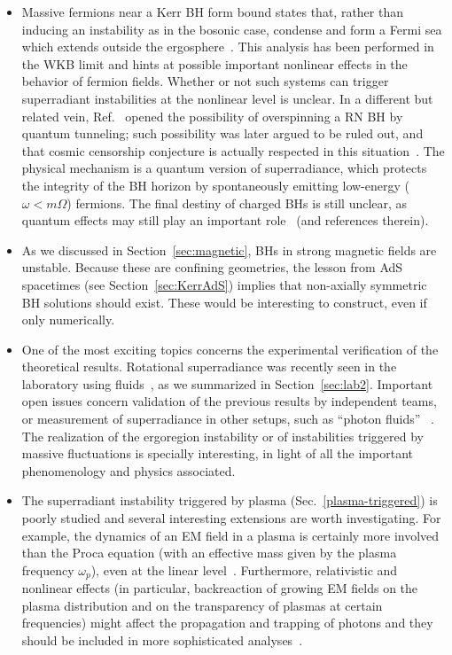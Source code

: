 \documentclass[11pt]{article}
\numberwithin{equation}{section} %
\begin{document}
\begin{itemize}
\item Massive fermions near a Kerr BH form bound states that, rather than inducing an instability as in the bosonic case, condense and form a Fermi sea which extends outside the ergosphere~\cite{Hartman:2009qu}. This analysis has been performed in the WKB limit and hints at possible important nonlinear effects in the behavior of fermion fields. Whether or not such systems can trigger superradiant instabilities at the nonlinear level is unclear. In a different but related vein, Ref.~\cite{Matsas:2007bj} opened the possibility of overspinning a RN BH by quantum tunneling;
such possibility was later argued to be ruled out, and that cosmic censorship conjecture is actually respected in this situation~\cite{Hod:2008kq}. The physical mechanism is a quantum version of superradiance, which protects the integrity of the BH horizon by spontaneously emitting low-energy ($\omega<m\Omega$) fermions. The final destiny of charged BHs is still unclear, as quantum effects may still play an important role~\cite{Richartz:2011vf} (and references therein).


\item As we discussed in Section~\ref{sec:magnetic}, BHs in strong magnetic fields are unstable. Because these are confining geometries, the lesson from AdS spacetimes (see Section~\ref{sec:KerrAdS})
implies that non-axially symmetric BH solutions should exist. These would be interesting to construct, even if only numerically.


\item One of the most exciting topics concerns the experimental verification of the theoretical results.
Rotational superradiance was recently seen in the laboratory using fluids~\cite{Torres:2016iee}, as we summarized in Section~\ref{sec:lab2}.
Important open issues concern validation of the previous results by independent teams, or measurement of superradiance in other setups, such as ``photon fluids''
~\cite{Prain:2019jqk}. The realization of the ergoregion instability or of instabilities triggered by massive fluctuations is specially interesting, in light of all
the important phenomenology and physics associated.


\item The superradiant instability triggered by plasma (Sec.~\ref{plasma-triggered}) is poorly studied and 
several interesting extensions are worth investigating. For example, the dynamics of an EM field in a plasma is certainly more involved than the Proca equation (with an effective mass given by the plasma frequency 
$\omega_p$), even at the linear level~\cite{Cannizzaro:2020uap}. Furthermore, relativistic and nonlinear 
effects (in particular, backreaction of growing EM fields on the plasma distribution and on the transparency of plasmas at certain frequencies) might affect the propagation and trapping of photons and they should be included in more sophisticated analyses~\cite{1970PhFl...13..472K,1971PhRvL..27.1342M,Cardoso:2020nst,Blas:2020kaa}.


\end{itemize}
\end{document}
